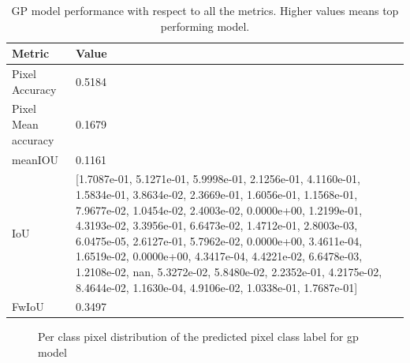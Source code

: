     \begin{table}
	\begin{center}
		\begin{tabular}{ | l | p{12cm} |}
			\hline
			
			\cellcolor{purple!30}Metric & \cellcolor{purple!30}Value \\ \hline
			Pixel Accuracy & 0.5184 \\ \hline
			Pixel Mean accuracy & 0.1679  \\ \hline
			meanIOU & 0.1161 \\ \hline
			IoU & [1.7087e-01, 5.1271e-01, 5.9998e-01, 2.1256e-01, 4.1160e-01, 1.5834e-01,
			3.8634e-02, 2.3669e-01, 1.6056e-01, 1.1568e-01, 7.9677e-02, 1.0454e-02,
			2.4003e-02, 0.0000e+00, 1.2199e-01, 4.3193e-02, 3.3956e-01, 6.6473e-02,
			1.4712e-01, 2.8003e-03, 6.0475e-05, 2.6127e-01, 5.7962e-02, 0.0000e+00,
			3.4611e-04, 1.6519e-02, 0.0000e+00, 4.3417e-04, 4.4221e-02, 6.6478e-03,
			1.2108e-02,        nan, 5.3272e-02, 5.8480e-02, 2.2352e-01, 4.2175e-02,
			8.4644e-02, 1.1630e-04, 4.9106e-02, 1.0338e-01, 1.7687e-01] \\ \hline
			FwIoU & 0.3497 \\ \hline
			\hline
		\end{tabular}
		\caption{GP model performance with respect to all the metrics. Higher values means top performing model.}
		\label{tab:caption}
	\end{center}
	\end{table}
	
	\begin{figure}%
		\centering
		\qquad
		\caption{Per class pixel distribution of the predicted pixel class label for gp model}%
		\label{fig:y_gt_and_predic_gp}%
	\end{figure}

